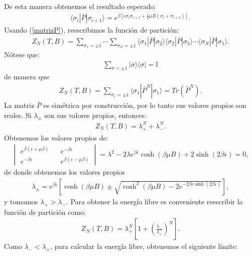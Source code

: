 \documentclass[letterpaper,12pt,oneside]{book}
\begin{document}
%
De esta manera obtenemos el resultado esperado: 
%
\begin{eqnarray}
\langle \sigma_{i}|\bar P |\sigma_{i+1}\rangle = e^{\beta\left[\epsilon \sigma_{i}\sigma_{i+1} +\frac{1}{2}\mu B(\sigma_{i} +\sigma_{i+1}) \right]}.
\end{eqnarray}
%
Usando (\ref{matrizP}), reescribimos la funci\'on de partici\'on:
%
\begin{eqnarray}
Z_{N}(T,B)=\sum_{\sigma_1=\pm 1} \cdots \sum_{\sigma_N=\pm 1} \langle \sigma_{1}|\bar P | \sigma_{2}\rangle\langle \sigma_{2}|\bar P | \sigma_{3}\rangle \cdots \langle \sigma_{N}|\bar P | \sigma_{1}\rangle.
\end{eqnarray}
%
N\'otese que:
%
\begin{eqnarray}
\sum_{\sigma = \pm 1} |\sigma\rangle\langle\sigma|  = \mathbb{I}
\end{eqnarray}
%
de manera que
%
\begin{eqnarray}
Z_N(T,B)=\sum_{\sigma_1 = \pm 1} \langle \sigma_1|\bar P^N |\sigma_1 \rangle = Tr(\bar P^N).
\end{eqnarray}
%
La matriz $\bar P$ es sim\'etrica por construcci\'on, por lo tanto sus valores propios son reales. Si $\lambda_{\pm}$ son sus valores propios, entonces: 
%
\begin{eqnarray}
Z_N(T,B)=\lambda_{+}^N+\lambda_{-}^N.
\end{eqnarray}
%
Obtenemos los valores propios de:
%
\begin{eqnarray}
\begin{vmatrix}
e^{\beta(\epsilon + \mu \beta )} && e^{-\beta \epsilon} \\
e^{-\beta \epsilon} && e^{\beta(\epsilon - \mu \beta )}
\end{vmatrix}=\lambda^2-2\lambda e^{\beta \epsilon}\cosh(\beta \mu B) + 2 \sinh(2\beta\epsilon)=0,
\end{eqnarray}
%
de donde obtenemos los valores propios
%
\begin{eqnarray}
\lambda_{\pm}=e^{\beta \epsilon}\left[\cosh(\beta\mu B)\pm\sqrt{\cosh^2(\beta\mu B)-2e^{-2\beta\epsilon\sinh(2\beta\epsilon)}}\right],
\end{eqnarray}
%
y tomamos $\lambda_{+}>\lambda_{-}$. Para obtener la energ\'ia libre es conveniente reescribir la función de partici\'on como:
%
\begin{eqnarray}
Z_{N}(T,B)=\lambda_{+}^N\left[1+\left(\frac{\lambda_{-}}{\lambda_{+}}\right)^N\right].
\end{eqnarray}
%
Como $\lambda_{-}<\lambda_{+}$, para calcular la energía libre, obtenemos el siguiente l\'imite:
\end{document}
